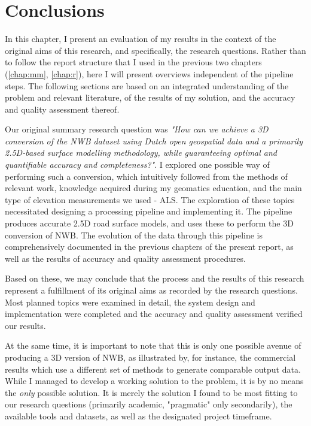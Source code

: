 
\chapter{Conclusions}
\label{chap:c}

In this chapter, I present an evaluation of my results in the context of the original aims of this research, and specifically, the research questions. Rather than to follow the report structure that I used in the previous two chapters (\ref{chap:mm}, \ref{chap:r}), here I will present overviews independent of the pipeline steps. The following sections are based on an integrated understanding of the problem and relevant literature, of the results of my solution, and the accuracy and quality assessment thereof.

Our original summary research question was \textit{"How can we achieve a 3D conversion of the NWB dataset using Dutch open geospatial data and a primarily 2.5D-based surface modelling methodology, while guaranteeing optimal and quantifiable accuracy and completeness?"}. I explored one possible way of performing such a conversion, which intuitively followed from the methods of relevant work, knowledge acquired during my geomatics education, and the main type of elevation measurements we used - ALS. The exploration of these topics necessitated designing a processing pipeline and implementing it. The pipeline produces accurate 2.5D road surface models, and uses these to perform the 3D conversion of NWB. The evolution of the data through this pipeline is comprehensively documented in the previous chapters of the present report, as well as the results of accuracy and quality assessment procedures.

Based on these, we may conclude that the process and the results of this research represent a fulfillment of its original aims as recorded by the research questions. Most planned topics were examined in detail, the system design and implementation were completed and the accuracy and quality assessment verified our results.

At the same time, it is important to note that this is only one possible avenue of producing a 3D version of NWB, as illustrated by, for instance, the commercial results which use a different set of methods to generate comparable output data. While I managed to develop a working solution to the problem, it is by no means the \textit{only} possible solution. It is merely the solution I found to be most fitting to our research questions (primarily academic, "pragmatic" only secondarily), the available tools and datasets, as well as the designated project timeframe.

